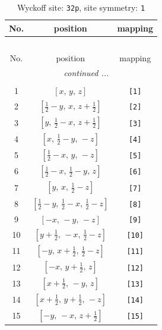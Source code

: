 \documentclass[fleqn,8pt]{jsarticle}
\begin{document}
\renewcommand{\arraystretch}{1.2}
\begin{longtable}{ccc}
\caption{Wyckoff site: {\tt 32p}, site symmetry: {\tt 1}}
 \\
 \hline \hline
No. & position & mapping \\ \hline \endfirsthead

\multicolumn{2}{l}{\tablename\ \thetable{}} \\
 \hline \hline
No. & position & mapping \\ \hline \endhead

 \hline \hline
\multicolumn{2}{r}{\footnotesize\it continued ...} \\ \endfoot

 \hline \hline
\multicolumn{2}{r}{} \\ \endlastfoot

1 & $\left[ x,\, y,\, z \right]$ & {\tt [1]} \\ \hline
2 & $\left[ \frac{1}{2} - y,\, x,\, z + \frac{1}{2} \right]$ & {\tt [2]} \\ \hline
3 & $\left[ y,\, \frac{1}{2} - x,\, z + \frac{1}{2} \right]$ & {\tt [3]} \\ \hline
4 & $\left[ x,\, \frac{1}{2} - y,\, - z \right]$ & {\tt [4]} \\ \hline
5 & $\left[ \frac{1}{2} - x,\, y,\, - z \right]$ & {\tt [5]} \\ \hline
6 & $\left[ \frac{1}{2} - x,\, \frac{1}{2} - y,\, z \right]$ & {\tt [6]} \\ \hline
7 & $\left[ y,\, x,\, \frac{1}{2} - z \right]$ & {\tt [7]} \\ \hline
8 & $\left[ \frac{1}{2} - y,\, \frac{1}{2} - x,\, \frac{1}{2} - z \right]$ & {\tt [8]} \\ \hline
9 & $\left[ - x,\, - y,\, - z \right]$ & {\tt [9]} \\ \hline
10 & $\left[ y + \frac{1}{2},\, - x,\, \frac{1}{2} - z \right]$ & {\tt [10]} \\ \hline
11 & $\left[ - y,\, x + \frac{1}{2},\, \frac{1}{2} - z \right]$ & {\tt [11]} \\ \hline
12 & $\left[ - x,\, y + \frac{1}{2},\, z \right]$ & {\tt [12]} \\ \hline
13 & $\left[ x + \frac{1}{2},\, - y,\, z \right]$ & {\tt [13]} \\ \hline
14 & $\left[ x + \frac{1}{2},\, y + \frac{1}{2},\, - z \right]$ & {\tt [14]} \\ \hline
15 & $\left[ - y,\, - x,\, z + \frac{1}{2} \right]$ & {\tt [15]} \\ \hline

\end{longtable}
\end{document}
